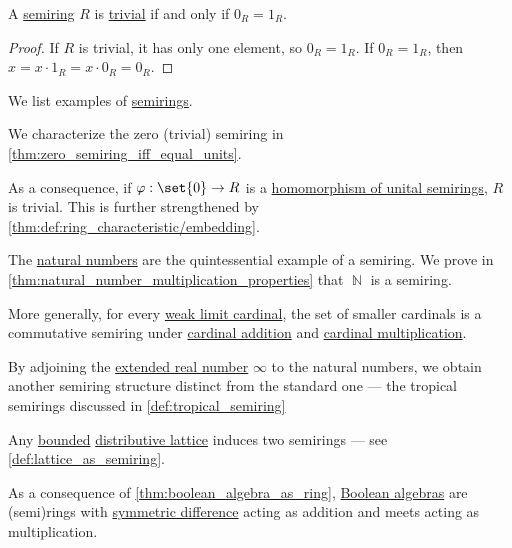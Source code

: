 \begin{proposition}\label{thm:zero_semiring_iff_equal_units}
  A \hyperref[def:semiring]{semiring} \( R \) is \hyperref[def:semiring/trivial]{trivial} if and only if \( 0_R = 1_R \).
\end{proposition}
\begin{proof}
  \SufficiencySubProof If \( R \) is trivial, it has only one element, so \( 0_R = 1_R \).
  \NecessitySubProof If \( 0_R = 1_R \), then \( x = x \cdot 1_R = x \cdot 0_R = 0_R \).
\end{proof}

\begin{example}\label{ex:def:semiring}
  We list examples of \hyperref[def:semiring]{semirings}.

  \begin{thmenum}
     We characterize the zero (trivial) semiring in \cref{thm:zero_semiring_iff_equal_units}.

    As a consequence, if \( \varphi: \set{ 0 } \to R \) is a \hyperref[def:semiring/morphism]{homomorphism of unital semirings}, \( R \) is trivial. This is further strengthened by \cref{thm:def:ring_characteristic/embedding}.

     The \hyperref[def:natural_numbers]{natural numbers} are the quintessential example of a semiring. We prove in \cref{thm:natural_number_multiplication_properties} that \( \BbbN \) is a semiring.

     More generally, for every \hyperref[def:successor_and_limit_cardinal/weak_limit]{weak limit cardinal}, the set of smaller cardinals is a commutative semiring under \hyperref[def:cardinal_arithmetic/addition]{cardinal addition} and \hyperref[def:cardinal_arithmetic/multiplication]{cardinal multiplication}.

     By adjoining the \hyperref[def:extended_real_numbers]{extended real number} \( \infty \) to the natural numbers, we obtain another semiring structure distinct from the standard one --- the tropical semirings discussed in \cref{def:tropical_semiring}

     Any \hyperref[def:bounded_lattice]{bounded} \hyperref[def:distributive_lattice]{distributive lattice} induces two semirings --- see \cref{def:lattice_as_semiring}.

     As a consequence of \cref{thm:boolean_algebra_as_ring}, \hyperref[def:boolean_algebra]{Boolean algebras} are (semi)rings with \hyperref[def:symmetric_difference]{symmetric difference} acting as addition and meets acting as multiplication.


\end{thmenum}
\end{example}
